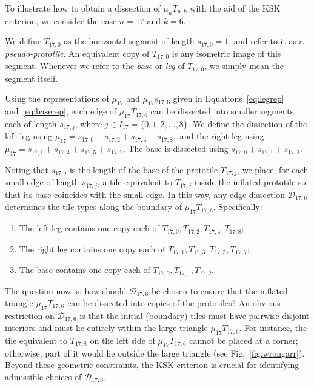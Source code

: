 To illustrate how to obtain a dissection of \(\mu_{n} T_{n,k}\) with the aid of the KSK criterion, we consider the case \(n = 17\) and \(k = 6\).

We define \(T_{17,0}\) as the horizontal segment of length \(s_{17,0} = 1\), and refer to it as a \textit{pseudo-prototile}. An equivalent copy of \(T_{17,0}\) is any isometric image of this segment. Whenever we refer to the \textit{base} or \textit{leg} of \(T_{17,0}\), we simply mean the segment itself.

Using the representations of \(\mu_{17}\) and \(\mu_{17} s_{17,6}\) given in Equations~\ref{eq:legrep} and~\ref{eq:baserep}, each edge of \(\mu_{17} T_{17,6}\) can be dissected into smaller segments, each of length \(s_{17,j}\), where \(j \in I_{17} = \{0, 1, 2, \ldots, 8\}\).  We define the dissection of the left leg using  
$\mu_{17} = s_{17,0} + s_{17,2} + s_{17,4} + s_{17,8},$ and the right leg using $\mu_{17} = s_{17,1} + s_{17,3} + s_{17,5} + s_{17,7}.$ The base is dissected using $s_{17,0} + s_{17,1} + s_{17,2}.$

Noting that \(s_{17,j}\) is the length of the base of the prototile \(T_{17,j}\), we place, for each small edge of length \(s_{17,j}\), a tile equivalent to \(T_{17,j}\) inside the inflated prototile so that its base coincides with the small edge. In this way, any edge dissection \(\mathcal{D}_{17,6}\) determines the tile types along the boundary of \(\mu_{17} T_{17,6}\). Specifically:  
\begin{enumerate}
\item[-] The left leg contains one copy each of \(T_{17,0}, T_{17,2}, T_{17,4}, T_{17,8}\);  
\item[-] The right leg contains one copy each of \(T_{17,1}, T_{17,3}, T_{17,5}, T_{17,7}\);  
\item[-] The base contains one copy each of \(T_{17,0}, T_{17,1}, T_{17,2}\).  
\end{enumerate}

The question now is: how should \(\mathcal{D}_{17,6}\) be chosen to ensure that the inflated triangle \(\mu_{17} T_{17,6}\) can be dissected into copies of the prototiles? An obvious restriction on \(\mathcal{D}_{17,6}\) is that the initial (boundary) tiles must have pairwise disjoint interiors and must lie entirely within the large triangle \(\mu_{17} T_{17,6}\). For instance, the tile equivalent to \(T_{17,8}\) on the left side of \(\mu_{17} T_{17,6}\) cannot be placed at a corner; otherwise, part of it would lie outside the large triangle (see Fig.~\ref{fig:wrongarr}). Beyond these geometric constraints, the KSK criterion is crucial for identifying admissible choices of \(\mathcal{D}_{17,6}\).

